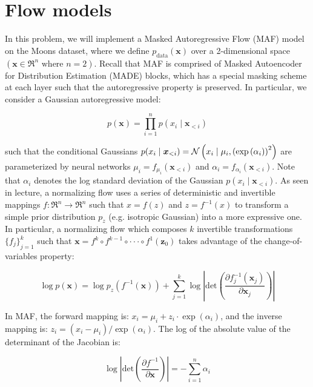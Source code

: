 \section{Flow models}

In this problem, we will implement a Masked Autoregressive Flow (MAF) model on the Moons dataset, where we define 
$p_{\text{data}}(\bm{x})$ over a 2-dimensional space $(\bm{x} \in \Re^{n} \text{ where } n = 2)$. Recall that MAF is 
comprised of Masked Autoencoder for Distribution Estimation (MADE) blocks, which has a special masking scheme at 
each layer such that the autoregressive property is preserved. In particular, we consider a Gaussian autoregressive model:

\begin{equation} \label{eq:1}
    p(\bm{x}) = \prod\limits_{i=1}^{n}p(x_{i} \mid \bm{x}_{<i})
\end{equation}

such that the conditional Gaussians $p(x_i \mid \bm{x}_{<i}) = \mathcal{N}\left(x_i \mid \mu_i, \left(\exp\left(\alpha_{i}\right)\right)^2\right)$ 
are parameterized by neural networks $\mu_{i} = f_{\mu_{i}}(\bm{x}_{<i})$ and $\alpha_{i} = f_{\alpha_{i}}(\bm{x}_{<i})$.
Note that $\alpha_i$ denotes the log standard deviation of the Gaussian $p(x_i \mid \bm{x}_{<i})$. As seen in lecture, a 
normalizing flow uses a series of deterministic and invertible mappings $f : \Re^{n} \rightarrow \Re^{n}$ such that 
$x = f(z)$ and $z = f^{-1}(x)$ to transform a simple prior distribution $p_z$ (e.g. isotropic Gaussian) into a more 
expressive one. In particular, a normalizing flow which composes $k$ invertible transformations ${\{f_{j}\}}_{j=1}^{k}$ 
such that $\bm{x} = f^{k} \circ f^{k-1} \circ \cdot \cdot \cdot \circ f^{1}(\bm{z}_0)$ takes advantage of the 
change-of-variables property:

\begin{equation} \label{eq:2}
    \log p(\bm{x}) = \log p_{z}\left(f^{-1}\left(\bm{x}\right)\right) + \sum\limits_{j=1}^{k} \log \left\lvert\text{det}\left(\frac{\partial f^{-1}_j\left(\bm{x}_j\right)}{\partial \bm{x}_j}\right)\right\rvert
\end{equation}

In MAF, the forward mapping is: $x_{i} = \mu_{i} + z_i \cdot \exp(\alpha_{i})$, and the inverse mapping is: 
$z_{i} = (x_{i}-\mu_{i}) / \exp(\alpha_{i})$. The log of the absolute value of the determinant of the Jacobian is:

\begin{equation} \label{eq:3}
    \log \left\lvert \text{det} \left(\frac{\partial f^{-1}}{\partial \bm{x}}\right)\right\rvert = - \sum\limits_{i=1}^{n} \alpha_{i}
\end{equation}

